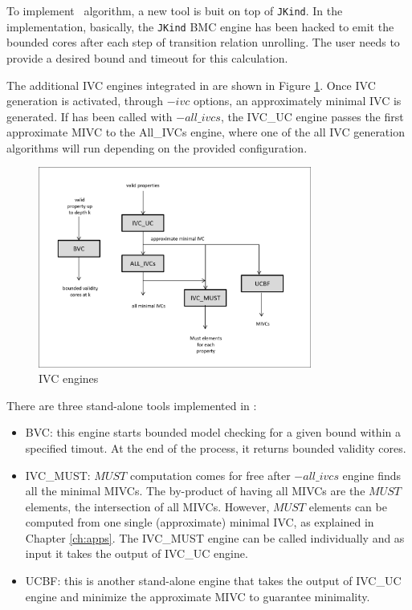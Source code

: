 To implement \bvcalg\ algorithm, a new tool is buit on top of \texttt{JKind}. In the implementation, basically, the \texttt{JKind} BMC engine has been hacked to emit the bounded cores after each step of transition relation unrolling. The user needs to provide a desired bound and timeout for this calculation.

The additional IVC engines integrated in \jkind are shown in Figure \ref{fig:ivcengines}. 
Once IVC generation is activated, through $-ivc$ options, an approximately minimal IVC is generated. If \jkind has been called with $-all\_ivcs$, the IVC\_UC engine passes the first approximate MIVC to the All\_IVCs engine, where one of the all IVC generation algorithms will run depending on the provided configuration.

\begin{figure}
  \centering
  \includegraphics[width=0.8\textwidth]{ivceng.png}
  \caption{\jkind IVC engines}
  \label{fig:ivcengines}
\end{figure}

\noindent There are three stand-alone tools implemented in \jkind:
\begin{itemize}
  \item BVC: this engine starts bounded model checking for a given bound within a specified timout. At the end of the process, it returns bounded validity cores.
  \item IVC\_MUST: $MUST$ computation comes for free after  $-all\_ivcs$ engine finds all the minimal MIVCs. The by-product of having all MIVCs are the $MUST$ elements, the intersection of all MIVCs. However, $MUST$ elements can be computed from one single (approximate) minimal IVC, as explained in Chapter \ref{ch:apps}. The IVC\_MUST engine can be called individually and as input it takes the output of IVC\_UC engine.
  \item UCBF: this is another stand-alone engine that takes the output of IVC\_UC engine and minimize the approximate MIVC to guarantee minimality.
\end{itemize}

